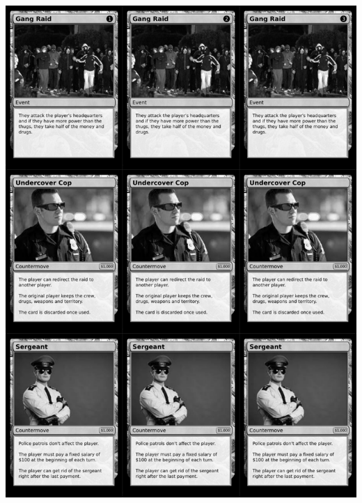 \documentclass[a4paper]{article}
\begin{document}
\newpage

\begin{center}
	\centering
	\includegraphics[width=200.5mm,height=280.7mm]{output/temp/page32.png}
\end{center}
\end{document}
